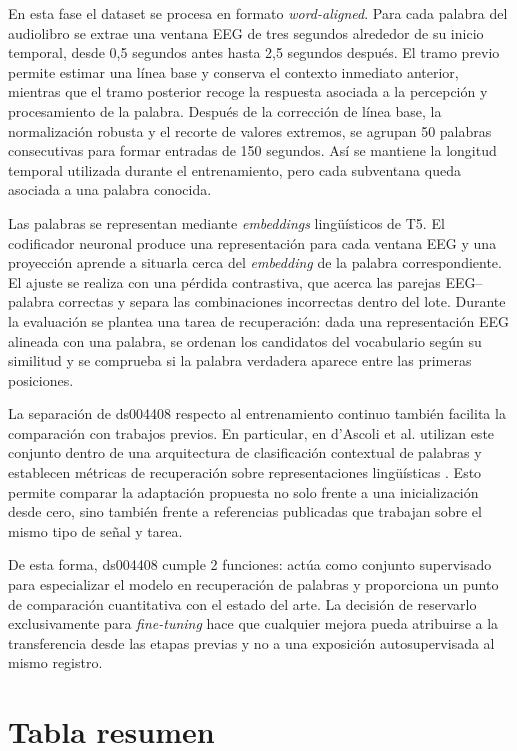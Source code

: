 En esta fase el dataset se procesa en formato \textit{word-aligned}. Para cada palabra del audiolibro se extrae una ventana EEG de tres segundos alrededor de su inicio temporal, desde 0,5 segundos antes hasta 2,5 segundos después. El tramo previo permite estimar una línea base y conserva el contexto inmediato anterior, mientras que el tramo posterior recoge la respuesta asociada a la percepción y procesamiento de la palabra. Después de la corrección de línea base, la normalización robusta y el recorte de valores extremos, se agrupan 50 palabras consecutivas para formar entradas de 150 segundos. Así se mantiene la longitud temporal utilizada durante el entrenamiento, pero cada subventana queda asociada a una palabra conocida.

Las palabras se representan mediante \textit{embeddings} lingüísticos de T5. El codificador neuronal produce una representación para cada ventana EEG y una proyección aprende a situarla cerca del \textit{embedding} de la palabra correspondiente. El ajuste se realiza con una pérdida contrastiva, que acerca las parejas EEG--palabra correctas y separa las combinaciones incorrectas dentro del lote. Durante la evaluación se plantea una tarea de recuperación: dada una representación EEG alineada con una palabra, se ordenan los candidatos del vocabulario según su similitud y se comprueba si la palabra verdadera aparece entre las primeras posiciones.

La separación de ds004408 respecto al entrenamiento continuo también facilita la comparación con trabajos previos. En particular, en d'Ascoli et al. utilizan este conjunto dentro de una arquitectura de clasificación contextual de palabras y establecen métricas de recuperación sobre representaciones lingüísticas \cite{dascoli2025words}. Esto permite comparar la adaptación propuesta no solo frente a una inicialización desde cero, sino también frente a referencias publicadas que trabajan sobre el mismo tipo de señal y tarea.

De esta forma, ds004408 cumple 2 funciones: actúa como conjunto supervisado para especializar el modelo en recuperación de palabras y proporciona un punto de comparación cuantitativa con el estado del arte. La decisión de reservarlo exclusivamente para \textit{fine-tuning} hace que cualquier mejora pueda atribuirse a la transferencia desde las etapas previas y no a una exposición autosupervisada al mismo registro.

\section{Tabla resumen}

